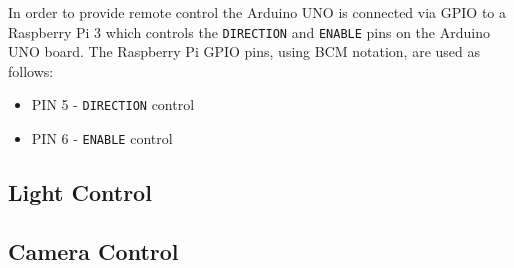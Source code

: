 In order to provide remote control the Arduino UNO is connected via GPIO to a Raspberry Pi 3 which controls the \texttt{DIRECTION} and \texttt{ENABLE} pins on the Arduino UNO board. The Raspberry Pi GPIO pins, using BCM notation, are used as follows:

\begin{itemize}
    \item PIN  5 - \texttt{DIRECTION} control
    \item PIN  6 - \texttt{ENABLE} control
\end{itemize}


\subsection{Light Control}
\subsection{Camera Control}
